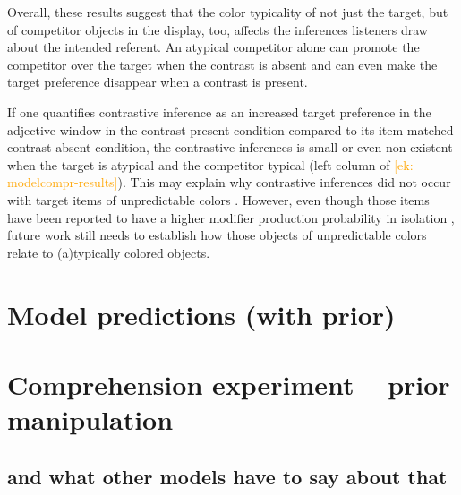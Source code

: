 \documentclass[a4paper,man,floatsintext,natbib]{apa6}
\newcommand{\ek}[1]{\textcolor{Orange}{[ek: #1]}}
\begin{document}

Overall, these results suggest that the color typicality of not just the target, but of competitor objects in the display, too, affects the inferences listeners draw about the intended referent. An atypical competitor alone can promote the competitor over the target when the contrast is absent and can even make the target preference disappear when a contrast is present. %

If one quantifies contrastive inference as an increased target preference in the adjective window in the contrast-present condition compared to its item-matched contrast-absent condition, the contrastive inferences is small or even non-existent when the target is atypical and the competitor typical (left column of \ek{modelcompr-results}). This may explain why contrastive inferences did not occur with target items of unpredictable colors \cite{Sedivy:2003}. However, even though those items have been reported to have a higher modifier production probability in isolation \cite{Sedivy:2003}, future work still needs to establish how those objects of unpredictable colors relate to (a)typically colored objects.

\section{Model predictions (with prior)}\label{sec:model-noprior}

\section{Comprehension experiment -- prior manipulation}\label{sec:exp2comp-prior}

\subsection{and what other models have to say about that}
\end{document}
